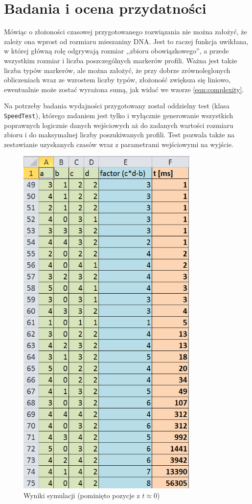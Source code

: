 \documentclass[11pt,a4paper]{article}
\begin{document}
\section{Badania i ocena przydatności}\label{badania}
Mówiąc o złożoności czasowej przygotowanego rozwiązania nie można założyć, że zależy ona wprost od rozmiaru mieszaniny DNA. Jest to raczej funkcja uwikłana, w której główną rolę odgrywają rozmiar ,,zbioru obowiązkowego'', a przede wszystkim rozmiar i liczba poszczególnych markerów profili. Ważna jest także liczba typów markerów, ale można założyć, że przy dobrze zrównoleglonych obliczeniach wraz ze wzrostem liczby typów, złożoność zwiększa się liniowo, ewentualnie może zostać wyrażona sumą, jak widać we wzorze \ref{eqn:complexity}.

Na potrzeby badania wydajności przygotowany został oddzielny test (klasa \texttt{SpeedTest}), którego zadaniem jest tylko i wyłącznie generowanie wszystkich poprawnych logicznie danych wejściowych aż do zadanych wartości rozmiaru zbioru i do maksymalnej liczby poszukiwanych profili. Test pozwala także na zestawianie uzyskanych czasów wraz z parametrami wejściowymi na wyjście. 

\begin{figure}
\centering
\includegraphics[width=0.80\textwidth]{excel.png}
\caption{Wyniki symulacji (pominięto pozycje z $t\approx0$)} 
\label{img:excel}
\end{figure}
\end{document}

